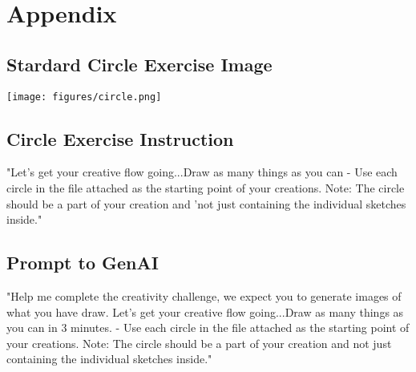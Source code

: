 \section{Appendix}

\subsection{Stardard Circle Exercise Image}
\begin{center}
    \texttt{[image: figures/circle.png]} %
\end{center}

\subsection{Circle Exercise Instruction}


"Let's get your creative flow going...Draw as many things as you can - Use each circle in the file attached as the starting point of your creations. Note: The circle should be a part of your creation and 'not just containing the individual sketches inside."


\subsection{Prompt to GenAI}



"Help me complete the creativity challenge, we expect you to generate images of what you have draw. Let's get your creative flow going...Draw as many things as you can in 3 minutes. - Use each circle in the file attached as the starting point of your creations. Note: The circle should be a part of your creation and not just containing the individual sketches inside."

